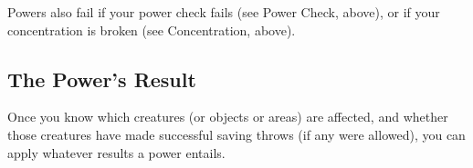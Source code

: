 Powers also fail if your power check fails (see Power Check, above), or if your concentration is broken (see Concentration, above).

\subsection{The Power's Result}
Once you know which creatures (or objects or areas) are affected, and whether those creatures have made successful saving throws (if any were allowed), you can apply whatever results a power entails.


